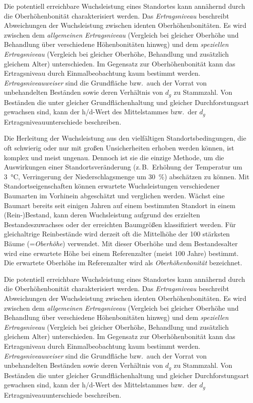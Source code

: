 \documentclass[twocolumn, paper=a4, fontsize=10pt]{scrartcl}
\begin{document}
Die potentiell erreichbare Wuchsleistung eines Standortes kann annähernd durch die Oberhöhenbonität charakterisiert werden. Das \emph{Ertragsniveau} beschreibt Abweichungen der Wuchsleistung zwischen identen Oberhöhenbonitäten. Es wird zwischen dem \emph{allgemeinen Ertragsniveau} (Vergleich bei gleicher Oberhöhe und Behandlung über verschiedene Höhenbonitäten hinweg) und dem \emph{speziellen Ertragsniveau} (Vergleich bei gleicher Oberhöhe, Behandlung und zusätzlich gleichem Alter) unterschieden. Im Gegensatz zur Oberhöhenbonität kann das Ertragsniveau durch Einmalbeobachtung kaum bestimmt werden. \emph{Ertragsniveauweiser} sind die Grundfläche bzw.\ auch der Vorrat von unbehandelten Beständen sowie deren Verhältnis von $d_g$ zu Stammzahl. Von Beständen die unter gleicher Grundflächenhaltung und gleicher Durchforstungsart gewachsen sind, kann der h/d-Wert des Mittelstammes bzw.\ der $d_g$ Ertragsniveauunterschiede beschreiben.

Die Herleitung der Wuchsleistung aus den vielfältigen Standortsbedingungen, die oft schwierig oder nur mit großen Unsicherheiten erhoben werden können, ist komplex und meist ungenau. Dennoch ist sie die einzige Methode, um die Auswirkungen einer Standortsveränderung (z.\,B.\ Erhöhung der Temperatur um \qty{3}{\celsius}, Verringerung der Niederschlagsmenge um \qty{30}{\%}) abschätzen zu können. Mit Standortseigenschaften können erwartete Wuchsleistungen verschiedener Baumarten im Vorhinein abgeschätzt und verglichen werden. Wächst eine Baumart bereits seit einigen Jahren auf einem bestimmten Standort in einem (Rein-)Bestand, kann deren Wuchsleistung aufgrund des erzielten Bestandeszuwachses oder der erreichten Baumgrößen klassifiziert werden. Für gleichaltrige Reinbestände wird derzeit oft die Mittelhöhe der 100 stärksten Bäume (=\emph{Oberhöhe}) verwendet. Mit dieser Oberhöhe und dem Bestandesalter wird eine erwartete Höhe bei einem Referenzalter (meist 100 Jahre) bestimmt. Die erwartete Oberhöhe im Referenzalter wird als \emph{Oberhöhenbonität} bezeichnet.

Die potentiell erreichbare Wuchsleistung eines Standortes kann annähernd durch die Oberhöhenbonität charakterisiert werden. Das \emph{Ertragsniveau} beschreibt Abweichungen der Wuchsleistung zwischen identen Oberhöhenbonitäten. Es wird zwischen dem \emph{allgemeinen Ertragsniveau} (Vergleich bei gleicher Oberhöhe und Behandlung über verschiedene Höhenbonitäten hinweg) und dem \emph{speziellen Ertragsniveau} (Vergleich bei gleicher Oberhöhe, Behandlung und zusätzlich gleichem Alter) unterschieden. Im Gegensatz zur Oberhöhenbonität kann das Ertragsniveau durch Einmalbeobachtung kaum bestimmt werden. \emph{Ertragsniveauweiser} sind die Grundfläche bzw.\ auch der Vorrat von unbehandelten Beständen sowie deren Verhältnis von $d_g$ zu Stammzahl. Von Beständen die unter gleicher Grundflächenhaltung und gleicher Durchforstungsart gewachsen sind, kann der h/d-Wert des Mittelstammes bzw.\ der $d_g$ Ertragsniveauunterschiede beschreiben.
\end{document}

